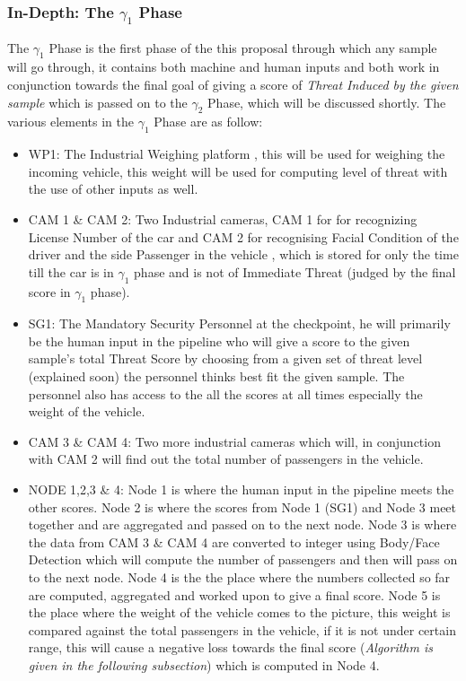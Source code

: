 \documentclass[a4paper,11pt]{article}
\begin{document}
\subsubsection{In-Depth: The $\gamma_1$ Phase}
The $\gamma_1$ Phase is the first phase of the this proposal through which any sample will go through, it contains both machine and human inputs and both work in conjunction towards the final goal of giving a score of \textit{Threat Induced by the given sample} which is passed on to the $\gamma_2$ Phase, which will be discussed shortly.
\newline\newline
The various elements in the $\gamma_1$ Phase are as follow:
\begin{itemize}
\item{WP1: The Industrial Weighing platform \textbf{\cite{Weighing Platform}}, this will be used for weighing the incoming vehicle, this weight will be used for computing level of threat with the use of other inputs as well.}
\item{CAM 1 \& CAM 2: Two Industrial cameras, CAM 1 for for recognizing License Number of the car  \textbf{\cite{LP camera}} and CAM 2 for recognising Facial Condition of the driver and the side Passenger in the vehicle \textbf{\cite{FaceRecogCam}}, which is stored for only the time till the car is in $\gamma_1$ phase and is not of Immediate Threat (judged by the final score in $\gamma_1$ phase).}
\item{SG1: The Mandatory Security Personnel at the checkpoint, he will primarily be the human input in the pipeline who will give a score to the given sample's total Threat Score by choosing from a given set of threat level (explained soon) the personnel thinks best fit the given sample. The personnel also has access to the all the scores at all times especially the weight of the vehicle.}
\item{CAM 3 \& CAM 4: Two more industrial cameras \textbf{\cite{FaceRecogCam}} which will, in conjunction with CAM 2 will find out the total number of passengers in the vehicle.} 	
\item{NODE 1,2,3 \& 4: Node 1 is where the human input in the pipeline meets the other scores. Node 2 is where the scores from Node 1 (SG1) and Node 3 meet together and are aggregated and passed on to the next node. Node 3 is where the data from CAM 3 \& CAM 4 are converted to integer using Body/Face Detection \textbf{\cite{FaceFirst Platform}} which will compute the number of passengers and then will pass on to the next node. Node 4 is the the place where the numbers collected so far are computed, aggregated and worked upon to give a final score. Node 5 is the place where the weight of the vehicle comes to the picture, this weight is compared against the total passengers in the vehicle, if it is not under certain range, this will cause a negative loss towards the final score (\textit{Algorithm is given in the following subsection}) which is computed in Node 4.%
}


\end{itemize}
\end{document}
